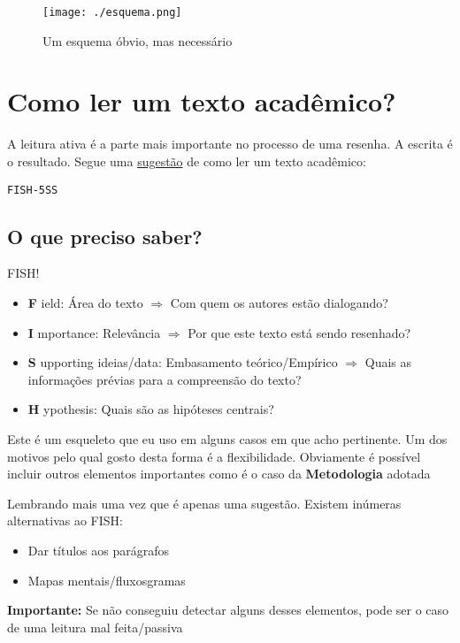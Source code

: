 \documentclass[11pt]{article}
\begin{document}
\begin{figure}[htbp]
\centering
\texttt{[image: ./esquema.png]}
\caption{\label{fig:esquema}Um esquema óbvio, mas necessário}
\end{figure}


\section*{Como ler um texto acadêmico?}
\label{sec:org196c99a}

A leitura ativa é a parte mais importante no processo de uma resenha. A escrita é o resultado.
Segue uma \uline{sugestão} de como ler um texto acadêmico:

\texttt{FISH-5SS}

\subsection*{O que preciso saber?}
\label{sec:org8881daf}

FISH!

\begin{itemize}
\item \textbf{F} ield: Área do texto \(\Rightarrow\) Com quem os autores estão dialogando?
\item \textbf{I} mportance: Relevância \(\Rightarrow\) Por que este texto está sendo resenhado?
\item \textbf{S} upporting ideias/data: Embasamento teórico/Empírico \(\Rightarrow\) Quais as informações prévias para a compreensão do texto?
\item \textbf{H} ypothesis: Quais são as hipóteses centrais?
\end{itemize}


\begin{NOTES}
Este é um esqueleto que eu uso em alguns casos em que acho pertinente. Um dos motivos pelo qual gosto desta forma é a flexibilidade.
Obviamente é possível incluir outros elementos importantes como é o caso da \textbf{Metodologia} adotada

Lembrando mais uma vez que é apenas uma sugestão. Existem inúmeras alternativas ao FISH:

\begin{itemize}
\item Dar títulos aos parágrafos
\item Mapas mentais/fluxosgramas
\end{itemize}

\textbf{Importante:} Se não conseguiu detectar alguns desses elementos, pode ser o caso de uma leitura mal feita/passiva
\end{NOTES}
\end{document}
